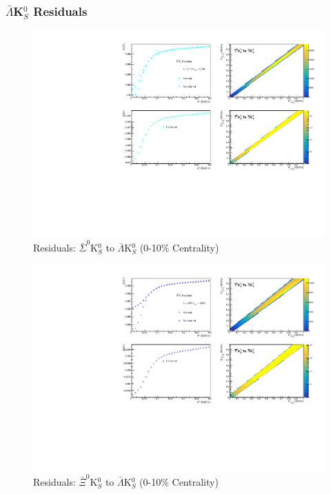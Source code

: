 \documentclass[../AnalysisNoteJBuxton.tex]{subfiles}
\begin{document}
\subsubsection{\texorpdfstring{$\bar{\Lambda}$K$^{0}_{S}$}{TEXT} Residuals}
\label{Residuals_ALamK0}

\begin{figure}[h]
  \centering
  \includegraphics[width=\textwidth]{9_AdditionalFigures/Figures/Residuals/ALamK0/Residuals_ALamK0_0010_ASig0K0_MomResCrctn_NonFlatBgdCrctn_SingleLamParam_10Res_PrimMaxDecay4fm_UsingXiDataAndCoulombOnly.pdf}
  \caption[Residuals: $\bar{\Sigma}^{0}$K$^{0}_{S}$ to $\bar{\Lambda}$K$^{0}_{S}$ (0-10\% Centrality)]{Residuals: $\bar{\Sigma}^{0}$K$^{0}_{S}$ to $\bar{\Lambda}$K$^{0}_{S}$ (0-10\% Centrality)}
  \label{fig:Res_ALamK0_0010_ASig0K0}
\end{figure}


\begin{figure}[h]
  \centering
  \includegraphics[width=\textwidth]{9_AdditionalFigures/Figures/Residuals/ALamK0/Residuals_ALamK0_0010_AXi0K0_MomResCrctn_NonFlatBgdCrctn_SingleLamParam_10Res_PrimMaxDecay4fm_UsingXiDataAndCoulombOnly.pdf}
  \caption[Residuals: $\bar{\Xi}^{0}$K$^{0}_{S}$ to $\bar{\Lambda}$K$^{0}_{S}$ (0-10\% Centrality)]{Residuals: $\bar{\Xi}^{0}$K$^{0}_{S}$ to $\bar{\Lambda}$K$^{0}_{S}$ (0-10\% Centrality)}
  \label{fig:Res_ALamK0_0010_AXi0K0}
\end{figure}
\end{document}

